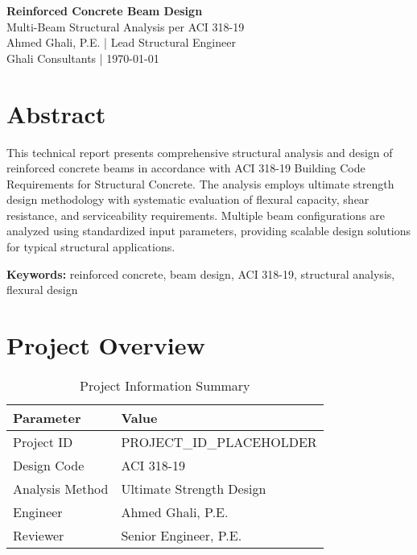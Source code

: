 \documentclass[
  10pt,
  letterpaper,
  twocolumn
]{article}
\begin{document}
\thispagestyle{firstpage}

\begin{center}
{\Large\textbf{\textcolor{ghaliblue}{Reinforced Concrete Beam Design}}} \\[0.3cm]
{\large\textcolor{ghaligray}{Multi-Beam Structural Analysis per ACI 318-19}} \\[0.5cm]
{\normalsize\textcolor{ghaliblue}{Ahmed Ghali, P.E.} | \textcolor{ghaligray}{Lead Structural Engineer}} \\
{\normalsize\textcolor{ghaligray}{Ghali Consultants | \today}} \\[1cm]
\end{center}

\section*{\textcolor{ghaliblue}{Abstract}}
This technical report presents comprehensive structural analysis and design of reinforced concrete beams in accordance with ACI 318-19 Building Code Requirements for Structural Concrete. The analysis employs ultimate strength design methodology with systematic evaluation of flexural capacity, shear resistance, and serviceability requirements. Multiple beam configurations are analyzed using standardized input parameters, providing scalable design solutions for typical structural applications.

\textbf{Keywords:} reinforced concrete, beam design, ACI 318-19, structural analysis, flexural design

\section{Project Overview}

\begin{table}[h]
\centering
\caption{Project Information Summary}
\label{tab:project_info}
\begin{tabular}{@{}ll@{}}
\toprule
\textbf{Parameter} & \textbf{Value} \\
\midrule
Project ID & PROJECT_ID_PLACEHOLDER \\
Design Code & ACI 318-19 \\
Analysis Method & Ultimate Strength Design \\
Engineer & Ahmed Ghali, P.E. \\
Reviewer & Senior Engineer, P.E. \\
\bottomrule
\end{tabular}
\end{table}
\end{document}
